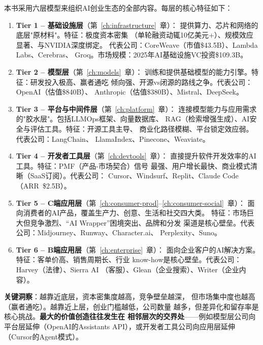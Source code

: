 \begin{corebox}
\small
本书采用六层模型来组织AI创业生态的全部内容。每层的核心特征如下：

\begin{enumerate}
  \item \textbf{Tier 1 -- 基础设施层}（第~\ref{ch:infrastructure}~章）：
    提供算力、芯片和网络的底层"原材料"。特征：极度资本密集
    （单轮融资动辄10亿美元+）、规模效应显著、与NVIDIA深度绑定。
    代表公司：CoreWeave（市值\$43.5B）、Lambda Labs、Cerebras、
    Groq。市场规模：2025年AI基础设施VC投资\$109.3B。

  \item \textbf{Tier 2 -- 模型层}（第~\ref{ch:models}~章）：
    训练和提供基础模型的能力引擎。特征：研发投入极高、赢者通吃
    倾向强、开源vs闭源的路线之争。代表公司：OpenAI（估值\$840B）、
    Anthropic（估值\$380B）、Mistral、DeepSeek。

  \item \textbf{Tier 3 -- 平台与中间件层}（第~\ref{ch:platform}~章）：
    连接模型能力与应用需求的"胶水层"。包括LLMOps框架、向量数据库、
    RAG（检索增强生成）、AI安全与评估工具。特征：开源工具主导、
    商业化路径模糊、平台锁定效应弱。代表公司：LangChain、
    LlamaIndex、Pinecone、Weaviate。

  \item \textbf{Tier 4 -- 开发者工具层}（第~\ref{ch:devtools}~章）：
    直接提升软件开发效率的AI工具。特征：PMF（产品-市场契合）信号
    最强、用户增长最快、商业模式清晰（SaaS订阅）。代表公司：
    Cursor、Windsurf、Replit、Claude Code（ARR~\$2.5B）。

  \item \textbf{Tier 5 -- C端应用层}（第~\ref{ch:consumer-prod}--\ref{ch:consumer-social}~章）：
    面向消费者的AI产品，覆盖生产力、创意、生活和社交四大类。
    特征：市场巨大但竞争激烈、``AI Wrapper''困境突出、品牌和分发
    渠道是核心壁垒。代表公司：Midjourney、Runway、Character.ai、
    Perplexity、Suno。

  \item \textbf{Tier 6 -- B端应用层}（第~\ref{ch:enterprise}~章）：
    面向企业客户的AI解决方案。特征：客单价高、销售周期长、行业
    know-how是核心壁垒。代表公司：Harvey（法律）、Sierra AI
    （客服）、Glean（企业搜索）、Writer（企业内容）。
\end{enumerate}

\medskip
\noindent\textbf{关键洞察}：越靠近底层，资本密集度越高，竞争壁垒越深，
但市场集中度也越高（赢者通吃）。越靠近上层，创业门槛越低，公司数量
越多，但差异化和留存率是核心挑战。\textbf{最大的价值创造往往发生在
相邻层次的交界处}——例如模型层公司向平台层延伸（OpenAI的Assistants
API），或开发者工具公司向应用层延伸（Cursor的Agent模式）。
\end{corebox}

